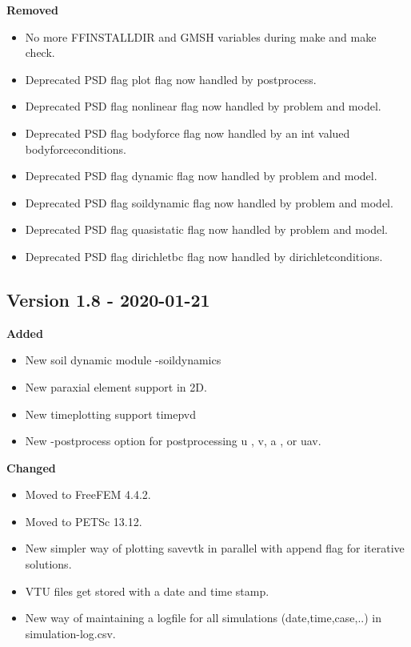 \textbf{Removed}
\begin{itemize}
\item No more {\ttfamily FFINSTALLDIR} and {\ttfamily GMSH} variables during {\ttfamily make} and {\ttfamily make check}.
\item Deprecated PSD flag  {\ttfamily plot} flag now handled by {\ttfamily postprocess}.
\item Deprecated PSD flag {\ttfamily nonlinear} flag now handled by {\ttfamily problem} and {\ttfamily model}.
\item Deprecated PSD flag {\ttfamily bodyforce} flag now handled by an {\ttfamily int} valued {\ttfamily bodyforceconditions}.
\item Deprecated PSD flag {\ttfamily dynamic} flag now handled by {\ttfamily problem} and {\ttfamily model}.
\item Deprecated PSD flag {\ttfamily soildynamic} flag now handled by {\ttfamily problem} and {\ttfamily model}.
\item Deprecated PSD flag {\ttfamily quasistatic} flag now handled by {\ttfamily problem} and {\ttfamily model}.
\item Deprecated PSD flag {\ttfamily dirichletbc} flag now handled by {\ttfamily dirichletconditions}.
\end{itemize}

\subsection{Version 1.8 - 2020-01-21}
\textbf{Added}
\begin{itemize}
 \item New soil dynamic module {\ttfamily -soildynamics}
 \item New paraxial element support in 2D.
 \item New timeplotting support {\ttfamily timepvd}
 \item New {\ttfamily -postprocess} option for postprocessing {\ttfamily u} , {\ttfamily v},  {\ttfamily a} , or {\ttfamily uav}. 
\end{itemize}

\textbf{Changed}
\begin{itemize}
 \item Moved to FreeFEM 4.4.2.
 \item Moved to PETSc 13.12.
 \item New simpler way of plotting {\ttfamily savevtk} in parallel with {\ttfamily append} flag for iterative solutions.
 \item VTU files get stored with a date and time stamp.
 \item New way of maintaining a logfile for all simulations (date,time,case,..) in {\ttfamily simulation-log.csv}.
\end{itemize}

